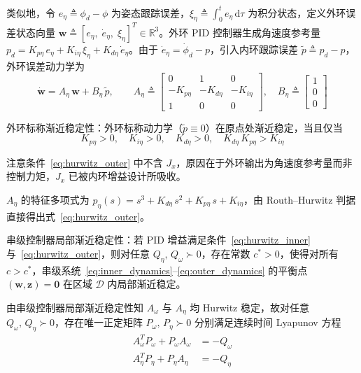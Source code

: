 类似地，令 $e_\eta \triangleq \phi_d - \phi$ 为姿态跟踪误差，$\xi_\eta \triangleq \int_0^t e_\eta\,\mathrm{d}\tau$ 为积分状态，定义外环误差状态向量 $\mathbf{w} \triangleq [e_\eta,\;\dot{e}_\eta,\;\xi_\eta]^T \in \mathbb{R}^3$。外环 PID 控制器生成角速度参考量 $p_d = K_{p\eta}\,e_\eta + K_{i\eta}\,\xi_\eta + K_{d\eta}\,\dot{e}_\eta$。由于 $\dot{e}_\eta = \dot{\phi}_d - p$，引入内环跟踪误差 $\tilde{p} \triangleq p_d - p$，外环误差动力学为
\begin{equation}
    \dot{\mathbf{w}} = A_\eta\,\mathbf{w} + B_\eta\,\tilde{p},\qquad
    A_\eta \triangleq
    \begin{bmatrix}
        0 & 1 & 0 \\
        -K_{p\eta} & -K_{d\eta} & -K_{i\eta} \\
        1 & 0 & 0
    \end{bmatrix},\quad
    B_\eta \triangleq
    \begin{bmatrix}1\\0\\0\end{bmatrix}
    \label{eq:outer_dynamics}
\end{equation}

外环标称渐近稳定性：外环标称动力学（$\tilde{p} \equiv 0$）在原点处渐近稳定，当且仅当
\begin{equation}
    K_{p\eta} > 0,\quad K_{i\eta} > 0,\quad K_{d\eta} > 0,\quad K_{d\eta}\,K_{p\eta} > K_{i\eta}
    \label{eq:hurwitz_outer}
\end{equation}

注意条件~\eqref{eq:hurwitz_outer} 中不含 $J_x$，原因在于外环输出为角速度参考量而非控制力矩，$J_x$ 已被内环增益设计所吸收。

$A_\eta$ 的特征多项式为 $p_\eta(s) = s^3 + K_{d\eta}\,s^2 + K_{p\eta}\,s + K_{i\eta}$，由 Routh--Hurwitz 判据直接得出式~\eqref{eq:hurwitz_outer}。

串级控制器局部渐近稳定性：若 PID 增益满足条件~\eqref{eq:hurwitz_inner} 与~\eqref{eq:hurwitz_outer}，则对任意 $Q_\eta,\,Q_\omega \succ 0$，存在常数 $c^* > 0$，使得对所有 $c > c^*$，串级系统~\eqref{eq:inner_dynamics}--\eqref{eq:outer_dynamics} 的平衡点 $(\mathbf{w},\mathbf{z}) = \mathbf{0}$ 在区域 $\mathcal{D}$ 内局部渐近稳定。

由串级控制器局部渐近稳定性知 $A_\omega$ 与 $A_\eta$ 均 Hurwitz 稳定，故对任意 $Q_\omega,\,Q_\eta \succ 0$，存在唯一正定矩阵 $P_\omega,\,P_\eta \succ 0$ 分别满足连续时间 Lyapunov 方程
\begin{align}
    A_\omega^T P_\omega + P_\omega A_\omega &= -Q_\omega \label{eq:lyap_inner} \\
    A_\eta^T  P_\eta  + P_\eta  A_\eta    &= -Q_\eta   \label{eq:lyap_outer}
\end{align}

